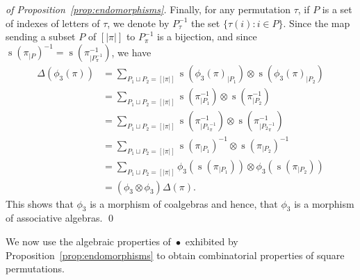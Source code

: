 \documentclass[a4paper]{llncs}
\DeclareMathOperator{\STD}{\mathrm{s}}
\DeclareMathOperator{\SHUFFLE}{\bullet}
\begin{document}
\begin{proof}[of Proposition~\ref{prop:endomorphisms}]
    Finally, for any permutation $\tau$, if $P$ is a set of indexes of
    letters of $\tau$, we denote by $P_\tau^{-1}$ the set
    $\{\tau(i) : i \in P\}$. Since the map sending a subset $P$ of
    $[|\pi|]$ to $P_\pi^{-1}$ is a bijection, and since
    $\STD\left(\pi_{|P}\right)^{-1} = \STD\left(\pi^{-1}_{|P_\pi^{-1}}\right)$,
    we have
    \begin{equation} \begin{split}
        \Delta(\phi_3(\pi))
        & = \sum_{P_1 \sqcup P_2 = [|\pi|]}
        \STD\left(\phi_3(\pi)_{|P_1}\right)
        \otimes \STD\left(\phi_3(\pi)_{|P_2}\right) \\
        & = \sum_{P_1 \sqcup P_2 = [|\pi|]}
        \STD\left(\pi^{-1}_{|P_1}\right)
        \otimes \STD\left(\pi^{-1}_{|P_2}\right) \\
        & = \sum_{P_1 \sqcup P_2 = [|\pi|]}
        \STD\left(\pi^{-1}_{|{P_1}_\pi^{-1}}\right)
        \otimes \STD\left(\pi^{-1}_{|{P_2}_\pi^{-1}}\right) \\
        & = \sum_{P_1 \sqcup P_2 = [|\pi|]}
        \STD\left(\pi_{|P_1}\right)^{-1}
        \otimes \STD\left(\pi_{|P_2}\right)^{-1} \\
        & = \sum_{P_1 \sqcup P_2 = [|\pi|]}
        \phi_3\left(\STD\left(\pi_{|P_1}\right)\right)
        \otimes \phi_3\left(\STD\left(\pi_{|P_2}\right)\right) \\
        & = (\phi_3 \otimes \phi_3) \Delta(\pi).
    \end{split} \end{equation}
    This shows that $\phi_3$ is a morphism of coalgebras and hence, that
    $\phi_3$ is a morphism of associative algebras.
    \qed
\end{proof}
\medskip

We now use the algebraic properties of $\SHUFFLE$ exhibited by
Proposition~\ref{prop:endomorphisms} to obtain combinatorial properties
of square permutations.
\medskip
\end{document}
